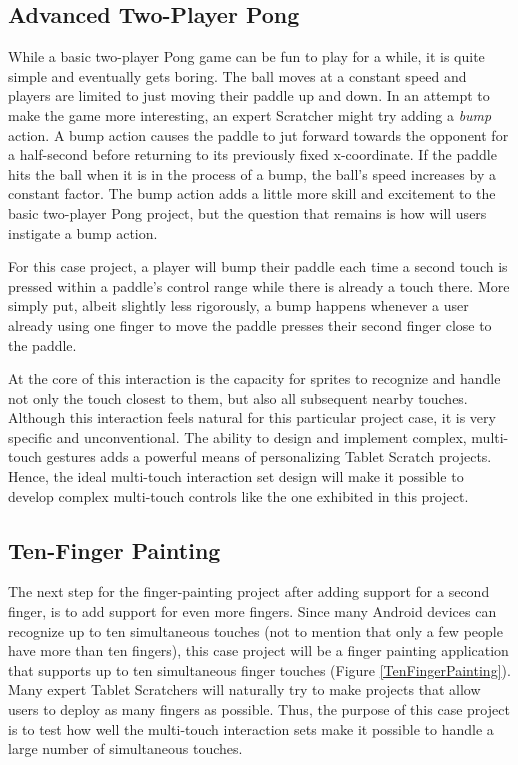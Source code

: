 \subsection{Advanced Two-Player Pong}
While a basic two-player Pong game can be fun to play for a while, it is quite simple and eventually gets boring. The ball moves at a constant speed and players are limited to just moving their paddle up and down. In an attempt to make the game more interesting, an expert Scratcher might try adding a \emph{bump} action. A bump action causes the paddle to jut forward towards the opponent for a half-second before returning to its previously fixed x-coordinate. If the paddle hits the ball when it is in the process of a bump, the ball's speed increases by a constant factor. The bump action adds a little more skill and excitement to the basic two-player Pong project, but the question that remains is how will users instigate a bump action.

For this case project, a player will bump their paddle each time a second touch is pressed within a paddle's control range while there is already a touch there. More simply put, albeit slightly less rigorously, a bump happens whenever a user already using one finger to move the paddle presses their second finger close to the paddle.

At the core of this interaction is the capacity for sprites to recognize and handle not only the touch closest to them, but also all subsequent nearby touches. Although this interaction feels natural for this particular project case, it is very specific and unconventional. The ability to design and implement complex, multi-touch gestures adds a powerful means of personalizing Tablet Scratch projects. Hence, the ideal multi-touch interaction set design will make it possible to develop complex multi-touch controls like the one exhibited in this project.

\subsection{Ten-Finger Painting}
The next step for the finger-painting project after adding support for a second finger, is to add support for even more fingers. Since many Android devices can recognize up to ten simultaneous touches (not to mention that only a few people have more than ten fingers), this case project will be a finger painting application that supports up to ten simultaneous finger touches (Figure \ref{TenFingerPainting}). Many expert Tablet Scratchers will naturally try to make projects that allow users to deploy as many fingers as possible. Thus, the purpose of this case project is to test how well the multi-touch interaction sets make it possible to handle a large number of simultaneous touches. 

